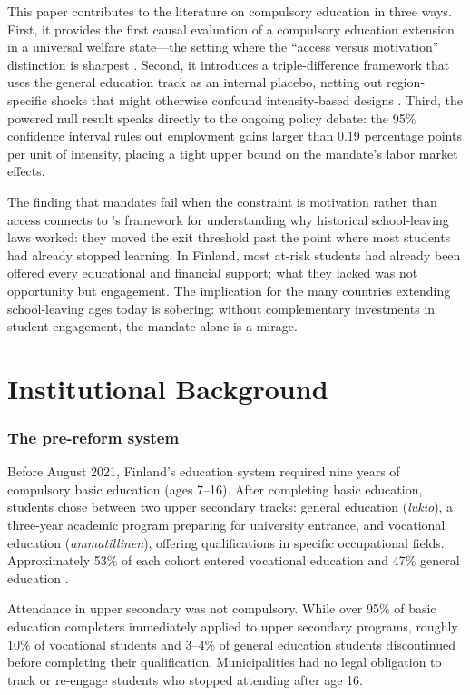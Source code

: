 \documentclass[12pt]{article}
\begin{document}
This paper contributes to the literature on compulsory education in three ways. First, it provides the first causal evaluation of a compulsory education extension in a universal welfare state---the setting where the ``access versus motivation'' distinction is sharpest \citep{Brunello2009}. Second, it introduces a triple-difference framework that uses the general education track as an internal placebo, netting out region-specific shocks that might otherwise confound intensity-based designs \citep{GruberHungerford1997}. Third, the powered null result speaks directly to the ongoing policy debate: the 95\% confidence interval rules out employment gains larger than 0.19 percentage points per unit of intensity, placing a tight upper bound on the mandate's labor market effects.

The finding that mandates fail when the constraint is motivation rather than access connects to \citet{Oreopoulos2006}'s framework for understanding why historical school-leaving laws worked: they moved the exit threshold past the point where most students had already stopped learning. In Finland, most at-risk students had already been offered every educational and financial support; what they lacked was not opportunity but engagement. The implication for the many countries extending school-leaving ages today is sobering: without complementary investments in student engagement, the mandate alone is a mirage.

\section{Institutional Background}

\subsubsection*{The pre-reform system} Before August 2021, Finland's education system required nine years of compulsory basic education (ages 7--16). After completing basic education, students chose between two upper secondary tracks: general education (\textit{lukio}), a three-year academic program preparing for university entrance, and vocational education (\textit{ammatillinen}), offering qualifications in specific occupational fields. Approximately 53\% of each cohort entered vocational education and 47\% general education \citep{StatFin2023}.

Attendance in upper secondary was not compulsory. While over 95\% of basic education completers immediately applied to upper secondary programs, roughly 10\% of vocational students and 3--4\% of general education students discontinued before completing their qualification. Municipalities had no legal obligation to track or re-engage students who stopped attending after age 16.
\end{document}
